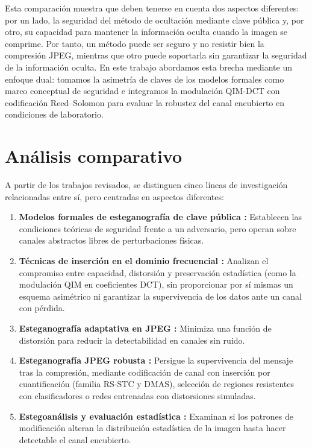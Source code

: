 \documentclass[IB]{TFUOC}%
\begin{document}
Esta comparación muestra que deben tenerse en cuenta dos aspectos diferentes: por un lado, la seguridad del método de ocultación mediante clave pública \cite{19,4} y, por otro, su capacidad para mantener la información oculta cuando la imagen se comprime. Por tanto, un método puede ser seguro y no resistir bien la compresión JPEG, mientras que otro puede soportarla sin garantizar la seguridad de la información oculta. En este trabajo abordamos esta brecha mediante un enfoque dual: tomamos la asimetría de claves de los modelos formales como marco conceptual de seguridad e integramos la modulación QIM-DCT con codificación Reed--Solomon para evaluar la robustez del canal encubierto en condiciones de laboratorio.

\section{Análisis comparativo}

A partir de los trabajos revisados, se distinguen cinco líneas de investigación relacionadas entre sí, pero centradas en aspectos diferentes:

\begin{enumerate}
    \item \textbf{Modelos formales de esteganografía de clave pública \cite{4, 19}:} Establecen las condiciones teóricas de seguridad frente a un adversario, pero operan sobre canales abstractos libres de perturbaciones físicas.
    \item \textbf{Técnicas de inserción en el dominio frecuencial \cite{11, 14, 15, 13}:} Analizan el compromiso entre capacidad, distorsión y preservación estadística (como la modulación QIM en coeficientes DCT), sin proporcionar por sí mismas un esquema asimétrico ni garantizar la supervivencia de los datos ante un canal con pérdida.
    \item \textbf{Esteganografía adaptativa en JPEG \cite{17}:} Minimiza una función de distorsión para reducir la detectabilidad en canales sin ruido.
    \item \textbf{Esteganografía JPEG robusta \cite{20, 18, zhu2018hidden, tancik2020stegastamp}:} Persigue la supervivencia del mensaje tras la compresión, mediante codificación de canal con inserción por cuantificación (familia RS-STC y DMAS), selección de regiones resistentes con clasificadores o redes entrenadas con distorsiones simuladas.
    \item \textbf{Estegoanálisis y evaluación estadística \cite{fridrich2012rich, kodovsky2012jpegrich, holub2015dctr, song2015gfr, boroumand2019srnet, lerch2016ats, 1}:} Examinan si los patrones de modificación alteran la distribución estadística de la imagen hasta hacer detectable el canal encubierto.
\end{enumerate}
\end{document}
